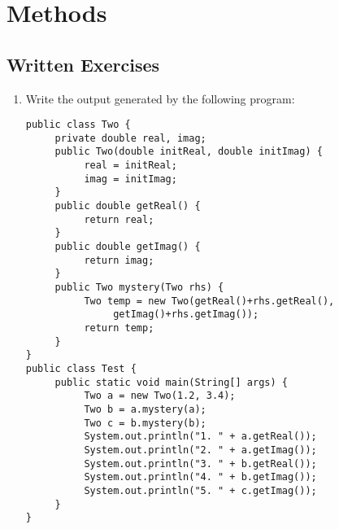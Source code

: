 \section{Methods}

\subsection{Written Exercises}

\setcounter{counter}{1}
\begin{enumerate}[label={\arabic{counter}\addtocounter{counter}{1}}.]

\item Write the output generated by the following program:
\begin{lstlisting}
public class Two {
     private double real, imag;
     public Two(double initReal, double initImag) {
          real = initReal;
          imag = initImag;
     }
     public double getReal() {
          return real;
     }
     public double getImag() {
          return imag;
     }
     public Two mystery(Two rhs) {
          Two temp = new Two(getReal()+rhs.getReal(), 
               getImag()+rhs.getImag());
          return temp;
     }
}
public class Test {
     public static void main(String[] args) {
          Two a = new Two(1.2, 3.4);
          Two b = a.mystery(a);
          Two c = b.mystery(b);
          System.out.println("1. " + a.getReal());
          System.out.println("2. " + a.getImag());
          System.out.println("3. " + b.getReal());
          System.out.println("4. " + b.getImag());
          System.out.println("5. " + c.getImag());
     }
}
\end{lstlisting}


\end{enumerate}
